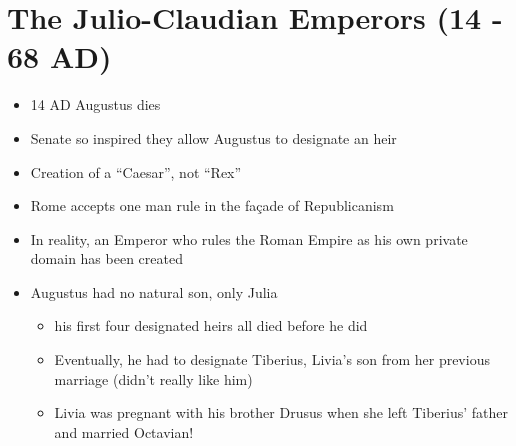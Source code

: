 \documentclass[12pt, twoside]{article}
\begin{document}
\section{The Julio-Claudian Emperors (14 - 68 AD)}
\begin{itemize}
\item 14 AD Augustus dies
\item Senate so inspired they allow Augustus to designate an heir
\item Creation of a “Caesar”, not “Rex”
\item Rome accepts one man rule in the façade of Republicanism
\item In reality, an Emperor who rules the Roman Empire as his own private domain has been created
\item Augustus had no natural son, only Julia
	\begin{itemize}
	\item his first four designated heirs all died before he did
	\item Eventually, he had to designate Tiberius, Livia’s son from her previous marriage (didn’t really like him)
	\item Livia was pregnant with his brother Drusus when she left Tiberius’ father and married Octavian!
	\end{itemize}
\end{itemize}
\end{document}
